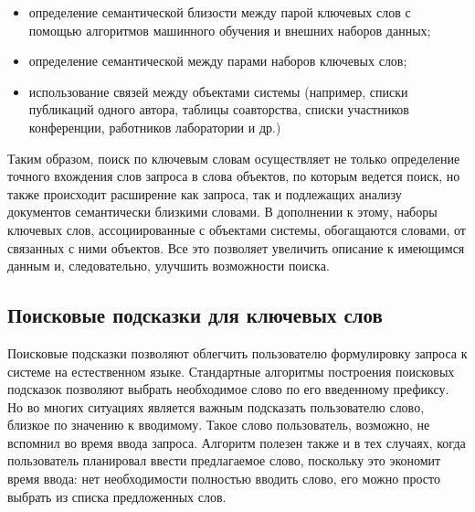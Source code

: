 \begin{itemize}
    \item определение семантической близости между парой ключевых слов с помощью алгоритмов машинного обучения и внешних наборов данных;
    \item определение семантической между парами наборов ключевых слов;
    \item использование связей между объектами системы (например, списки публикаций одного автора, таблицы соавторства, списки участников конференции, работников лаборатории и др.)
\end{itemize}

Таким образом, поиск по ключевым словам осуществляет не только определение точного вхождения слов запроса в слова объектов, по которым ведется поиск, но также происходит расширение как запроса, так и подлежащих анализу документов семантически близкими словами. В дополнении к этому, наборы ключевых слов, ассоциированные с объектами системы, обогащаются словами, от связанных с ними объектов. Все это позволяет увеличить описание к имеющимся данным и, следовательно, улучшить возможности поиска. 


\subsection{Поисковые подсказки для ключевых слов}
Поисковые подсказки позволяют облегчить пользователю формулировку запроса к системе на естественном языке. Стандартные алгоритмы построения поисковых подсказок позволяют выбрать необходимое слово по его введенному префиксу. Но во многих ситуациях является важным подсказать пользователю слово, близкое по значению к вводимому. Такое слово пользователь, возможно, не вспомнил во время ввода запроса. Алгоритм полезен также и в тех случаях, когда пользователь планировал ввести предлагаемое слово, поскольку это экономит время ввода: нет необходимости полностью вводить слово, его можно просто выбрать из списка предложенных слов.

